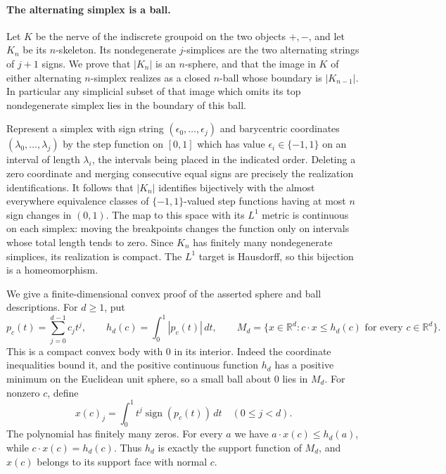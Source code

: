 \paragraph{The alternating simplex is a ball.}
Let $K$ be the nerve of the indiscrete groupoid on the two objects
$+,-$, and let $K_n$ be its $n$-skeleton.  Its nondegenerate
$j$-simplices are the two alternating strings of $j+1$ signs.
We prove that $|K_n|$ is an $n$-sphere, and that the image in $K$
of either alternating $n$-simplex realizes as a closed $n$-ball
whose boundary is $|K_{n-1}|$.  In particular any simplicial subset
of that image which omits its top nondegenerate simplex lies in
the boundary of this ball.

Represent a simplex with sign string $(\epsilon_0,\ldots,\epsilon_j)$
and barycentric coordinates $(\lambda_0,\ldots,\lambda_j)$ by the
step function on $[0,1]$ which has value $\epsilon_i\in\{-1,1\}$
on an interval of length $\lambda_i$, the intervals being placed in
the indicated order.  Deleting a zero coordinate and merging
consecutive equal signs are precisely the realization identifications.
It follows that $|K_n|$ identifies bijectively with the almost
everywhere equivalence classes of $\{-1,1\}$-valued step functions
having at most $n$ sign changes in $(0,1)$.  The map to this space
with its $L^1$ metric is continuous on each simplex: moving the
breakpoints changes the function only on intervals whose total
length tends to zero.  Since $K_n$ has finitely many nondegenerate
simplices, its realization is compact.  The $L^1$ target is Hausdorff,
so this bijection is a homeomorphism.

We give a finite-dimensional convex proof of the asserted sphere and
ball descriptions.  For $d\geq1$, put
\[
 p_c(t)=\sum_{j=0}^{d-1}c_jt^j,
 \qquad h_d(c)=\int_0^1|p_c(t)|\,dt,
 \qquad
 M_d=\{x\in\mathbb R^d:c\cdot x\leq h_d(c)
                    \text{ for every }c\in\mathbb R^d\}.
\]
This is a compact convex body with $0$ in its interior.  Indeed the
coordinate inequalities bound it, and the positive continuous function
$h_d$ has a positive minimum on the Euclidean unit sphere, so a small
ball about $0$ lies in $M_d$.  For nonzero $c$, define
\[
 x(c)_j=\int_0^1t^j\operatorname{sign}(p_c(t))\,dt
       \quad(0\leq j<d).
\]
The polynomial has finitely many zeros.  For every $a$ we have
$a\cdot x(c)\leq h_d(a)$, while
$c\cdot x(c)=h_d(c)$.  Thus $h_d$ is exactly the support function
of $M_d$, and $x(c)$ belongs to its support face with normal $c$.

